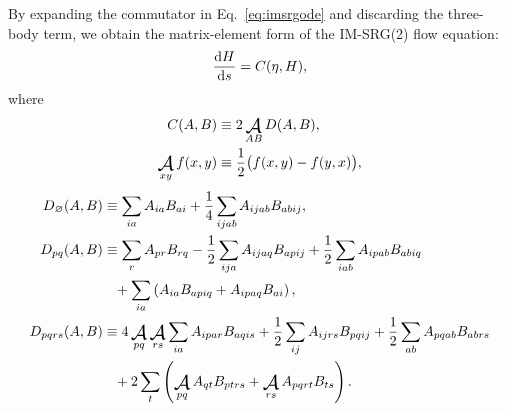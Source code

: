 By expanding the commutator in Eq.\ \eqref{eq:imsrgode} and discarding the three-body term, we obtain the matrix-element form of the IM-SRG(2) flow equation:
\begin{align}
    \frac{\operatorname{d\!} H}{\operatorname{d\!} s} = C(\eta, H), \label{eq:flowmxe}
\end{align}
where
\begin{align}
  C(A, B) &\equiv 2 \antisymm_{A B} D(A, B), \label{eq:commutmxe} \\
  \antisymm_{x y} f(x, y) &\equiv \frac{1}{2} \bigl(f(x, y) - f(y, x)\bigr),
\end{align}
\begin{align}
  D_\varnothing(A, B)
  &\equiv
    \sum_{i a} A_{i a} B_{a i}
    + \frac{1}{4} \sum_{i j a b} A_{i j a b} B_{a b i j},
    \label{eq:flow0} \\
  D_{p q}(A, B)
  &\equiv
    \sum_r A_{p r} B_{r q}
    - \frac{1}{2} \sum_{i j a} A_{i j a q} B_{a p i j}
    + \frac{1}{2} \sum_{i a b} A_{i p a b} B_{a b i q}
    \notag \\
  &\hphantom{=}
    + \sum_{i a} \left(
    A_{i a} B_{a p i q}
    + A_{i p a q} B_{a i}
    \right),
    \label{eq:flow1} \\
  D_{p q r s}(A, B)
  &\equiv
    4 \antisymm_{p q} \antisymm_{r s} \sum_{i a} A_{i p a r} B_{a q i s}
    + \frac{1}{2} \sum_{i j} A_{i j r s} B_{p q i j}
    + \frac{1}{2} \sum_{a b} A_{p q a b} B_{a b r s}
    \notag \\
  &\hphantom{=}
    + 2 \sum_t \left(
    \antisymm_{p q} A_{q t} B_{p t r s}
    + \antisymm_{r s} A_{p q r t} B_{t s}
    \right).
    \label{eq:flow2}
\end{align}

